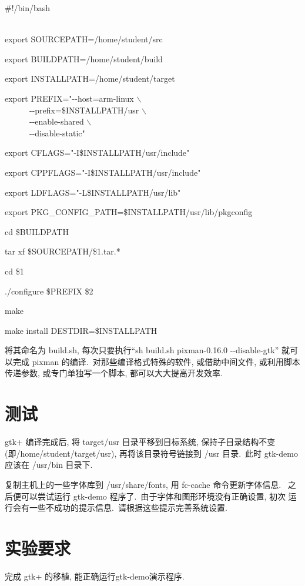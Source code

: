 \begin{boxedminipage}{.8\textwidth}
\setlength{\parindent}{0em}
   \#!/bin/bash\\ \ 

   export SOURCEPATH=/home/student/src

   export BUILDPATH=/home/student/build

   export INSTALLPATH=/home/student/target

   export PREFIX="-{}-host=arm-linux $\backslash$\\
   　　　-{}-prefix=\${INSTALLPATH}/usr    $\backslash$\\
   　　　-{}-enable-shared  $\backslash$\\
   　　　-{}-disable-static"

   export CFLAGS="-I\${INSTALLPATH}/usr/include"

   export CPPFLAGS="-I\${INSTALLPATH}/usr/include"

   export LDFLAGS="-L\${INSTALLPATH}/usr/lib"

   export PKG\_CONFIG\_PATH=\${INSTALLPATH}/usr/lib/pkgconfig

   cd \${BUILDPATH}

   tar xf \${SOURCEPATH}/\$1.tar.*

   cd \$1

   ./configure \${PREFIX} \$2

   make
   
   make install DESTDIR=\${INSTALLPATH}
\end{boxedminipage}

将其命名为 build.sh, 每次只要执行``sh build.sh pixman-0.16.0 -{}-disable-gtk''
就可以完成 pixman 的编译.~对那些编译格式特殊的软件, 或借助中间文件, 或利用脚本
传递参数, 或专门单独写一个脚本, 都可以大大提高开发效率.

\section{测试}
    gtk+ 编译完成后, 将 target/usr 目录平移到目标系统, 保持子目录结构不变
(即/home/student/target/usr), 再将该目录符号链接到 /usr 目录.~此时 gtk-demo
应该在 /usr/bin 目录下.

    复制主机上的一些字体库到 /usr/share/fonts, 用 fc-cache 命令更新字体信息.
~之后便可以尝试运行 gtk-demo 程序了.~由于字体和图形环境没有正确设置, 初次
运行会有一些不成功的提示信息.~请根据这些提示完善系统设置.

\section{实验要求}
    完成 gtk+ 的移植, 能正确运行gtk-demo演示程序.

